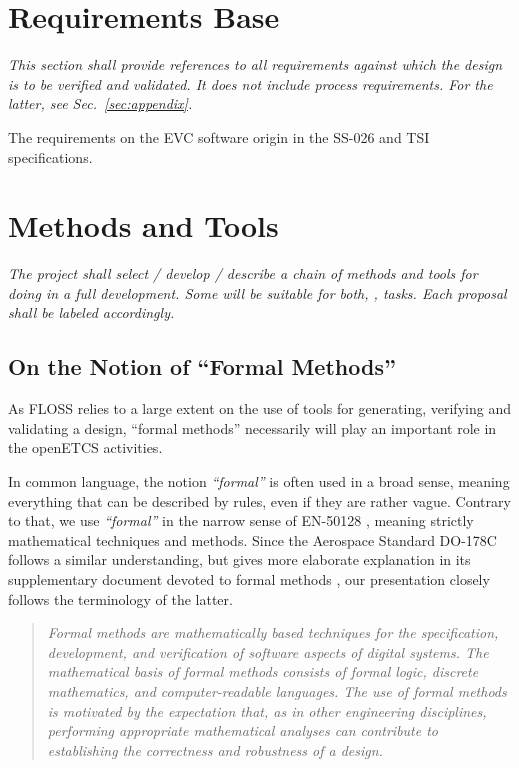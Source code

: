 \documentclass{template/openetcs_report}
\begin{document}
\section{Requirements Base}
\label{sec:requirements-base}

\textit{This section shall provide references to all requirements 
against which the design is to be verified and validated. It does not include 
process requirements. For the latter, see Sec.~\ref{sec:appendix}.}

The requirements on the EVC software origin in the SS-026 and TSI
specifications.



\section{\VV Methods and Tools }
\label{sec:methods-tools}

{\it The project shall select / develop / describe a chain of methods
  and tools for doing \vv in a full development. Some will be
  suitable for both, \vv, tasks. Each proposal shall be labeled accordingly.}


\subsection{On the Notion of ``Formal Methods''}
\label{sec:notion-formal-method}

As FLOSS relies to a large extent on the use of tools for generating, 
verifying and validating a design, ``formal methods'' necessarily will
play an important role in the openETCS activities.  

In common language, the notion {\em ``formal''} is often used in a
broad sense, meaning everything that can be described by rules, even
if they are rather vague.
%
Contrary to that, we use {\em ``formal''} in the narrow sense of
EN-50128 \cite[Section~D.28]{en50128},
meaning strictly mathematical techniques and methods.
%
Since the Aerospace Standard DO-178C \cite{DO-178C}
follows a similar understanding,
but gives more elaborate explanation in its supplementary document
devoted to formal methods \cite{DO-333},
our presentation closely follows the terminology of the latter.


\begin{quote}
{\em Formal methods are mathematically based techniques for the
specification, development, and verification of software aspects of
digital systems.
%
The mathematical basis of formal methods consists
of formal logic, discrete mathematics, and computer-readable
languages.
%
The use of formal methods is motivated by the expectation
that, as in other engineering disciplines, performing appropriate
mathematical analyses can contribute to establishing the correctness
and robustness of a design.}

\hfill
\cite[Section~1.0, p.1]{DO-333}
\end{quote}
\end{document}

